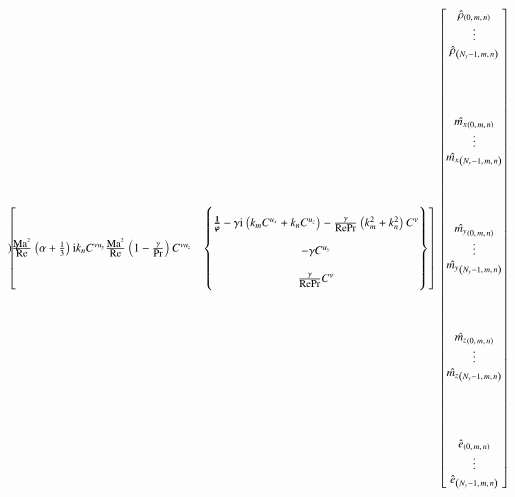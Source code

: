 \documentclass[letterpaper,11pt,nointlimits,reqno,draft]{amsart}
\newcommand{\ii}{\ensuremath{\mathrm{i}}}
\begin{document}
\begin{sidewaysfigure}
{{\begin{minipage}[c]{\textwidth}
\begin{align*}
\begin{bmatrix}
{\begin{pmatrix}
    \end{pmatrix}
  }{
    \frac{\Ma^2}{\Re}\left(\alpha+\frac{1}{3}\right)\ii\kn\C{\nu{}u_y}{}
  }{
    \frac{\Ma^2}{\Re}\left(1 - \frac{\g}{\Pr}\right) \C{\nu{}u_z}{}
  }
& \entry{ee     }
  \subcoeff{
      \bm{\frac{1}{\vp}} %
    - \g\ii\left(\km\C{u_x}{} + \kn\C{u_z}{}\right)
    - \frac{\g}{\Re\Pr}\left(\km^2+\kn^2\right)\C{\nu}{}
  }{
    - \g\C{u_y}{}
  }{
      \frac{\g}{\Re\Pr}\C{\nu}{}
  }
\end{bmatrix}
\renewcommand{\arraystretch}{1.0}
\begin{bmatrix}
  \hat{\rho}_{\left(0,\,m,\,n\right)} \\
  \vdots \\
  \hat{\rho}_{\left(N_y-1,\,m,\,n\right)} \\
\\%
\\%
\\%
\\%
  \hat{\mx}_{\left(0,\,m,\,n\right)} \\
  \vdots \\
  \hat{\mx}_{\left(N_y-1,\,m,\,n\right)} \\
\\%
\\%
\\%
\\%
  \hat{\my}_{\left(0,\,m,\,n\right)} \\
  \vdots \\
  \hat{\my}_{\left(N_y-1,\,m,\,n\right)} \\
\\%
\\%
\\%
\\%
  \hat{\mz}_{\left(0,\,m,\,n\right)} \\
  \vdots \\
  \hat{\mz}_{\left(N_y-1,\,m,\,n\right)} \\
\\%
\\%
\\%
\\%
  \hat{e}_{\left(0,\,m,\,n\right)} \\
  \vdots \\
  \hat{e}_{\left(N_y-1,\,m,\,n\right)} \\
%
\end{bmatrix}
\end{align*}
\end{minipage}}}  %
\vspace{2em}

\end{sidewaysfigure}
\end{document}

